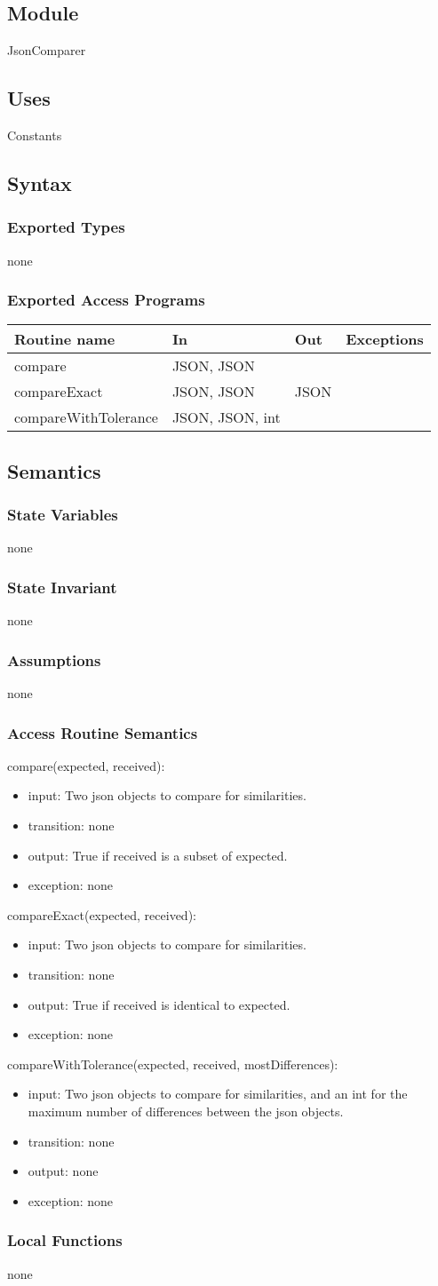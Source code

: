 \documentclass[12pt, titlepage]{article}
\newcommand{\newModule}[9]{
	\subsection* {Module}
		#1
	\subsection* {Uses}
		#2
	\subsection* {Syntax}
		\subsubsection* {Exported Types}
			#3
		\subsubsection* {Exported Access Programs}
			#4
	\subsection* {Semantics}
		\subsubsection* {State Variables}
			#5
		\subsubsection* {State Invariant}
			#6
		\subsubsection* {Assumptions}
			#7
		\subsubsection* {Access Routine Semantics}
			#8
		\subsubsection* {Local Functions}
			#9
}
\newcommand{\newAccessProgram}[5]{
	\noindent #1:
		\begin{itemize}
		    \item input: #2
			\item transition: #3
			\item output: #4
			\item exception: #5
		\end{itemize}
}
\newcommand{\row}[4]{#1 & #2 & #3 & #4 ~\\ \hline}
\newcommand{\accessProgramsTableStart}{
\begin{tabular}{| l | l | l | l |}
\hline
\textbf{Routine name} & \textbf{In} & \textbf{Out} & \textbf{Exceptions}\\
\hline
}
\newcommand{\accessProgramsTableEnd}{
	\end{tabular}
}
\begin{document}
\label{JsonComparer}

\newModule{JsonComparer}
	{%
		Constants
	}
	{%
		none
	}
	{%
		\accessProgramsTableStart
			\row{compare}{JSON, JSON}{}{}
			\row{compareExact}{JSON, JSON}{JSON}{}
            \row{compareWithTolerance}{JSON, JSON, int}{}{}
		\accessProgramsTableEnd
	}
	{%
		none \\

		 
	}
	{%
        none
	}
	{%
		none
	}
	{%
		\newAccessProgram{compare(expected, received)}
			{%
				Two json objects to compare for similarities.
			}
			{%
				none
			}
			{%
				True if received is a subset of expected.
			}
			{%
				none
			}
		\newAccessProgram{compareExact(expected, received)}
			{%
				Two json objects to compare for similarities.
			}
			{%
				none
			}
			{%
				True if received is identical to expected.
			}
			{%
				none
			}
		\newAccessProgram{compareWithTolerance(expected, received, mostDifferences)}
			{%
				Two json objects to compare for similarities, and an int for the maximum number of differences between the json objects.
			}
			{%
				none
			}
			{%
				none
			}
			{%
				none
			}
	}
	{%
		none
	}
	
\newpage


\end{document}
